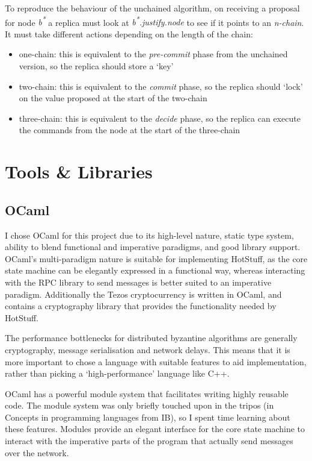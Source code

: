 To reproduce the behaviour of the unchained algorithm, on receiving a proposal for node \textit{b\textsuperscript{*}} a replica must look at \textit{b\textsuperscript{*}.justify.node} to see if it points to an \textit{n-chain}. It must take different actions depending on the length of the chain:

\begin{itemize}
\item one-chain: this is equivalent to the \textit{pre-commit} phase from the unchained version, so the replica should store a `key'
\item two-chain: this is equivalent to the \textit{commit} phase, so the replica should `lock' on the value proposed at the start of the two-chain
\item three-chain: this is equivalent to the \textit{decide} phase, so the replica can execute the commands from the node at the start of the three-chain
\end{itemize}

\section{Tools \& Libraries}
\subsection{OCaml}
I chose OCaml for this project due to its high-level nature, static type system, ability to blend functional and imperative paradigms, and good library support. OCaml's multi-paradigm nature is suitable for implementing HotStuff, as the core state machine can be elegantly expressed in a functional way, whereas interacting with the RPC library to send messages is better suited to an imperative paradigm. Additionally the Tezos cryptocurrency is written in OCaml, and contains a cryptography library that provides the functionality needed by HotStuff.

The performance bottlenecks for distributed byzantine algorithms are generally cryptography, message serialisation and network delays. This means that it is more important to chose a language with suitable features to aid implementation, rather than picking a `high-performance' language like C++.

OCaml has a powerful module system that facilitates writing highly reusable code. The module system was only briefly touched upon in the tripos (in Concepts in programming languages from IB), so I spent time learning about these features. Modules provide an elegant interface for the core state machine to interact with the imperative parts of the program that actually send messages over the network.

